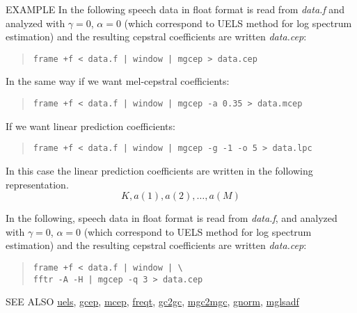 \begin{qsection}{EXAMPLE}
In the following speech data in float format is read
from {\em data.f} and analyzed with $\gamma=0$, $\alpha=0$
(which correspond to UELS method for log spectrum estimation)
and the resulting cepstral coefficients are written {\em data.cep}:
\begin{quote}
  \verb!frame +f < data.f | window | mgcep > data.cep !
\end{quote}

In the same way if we want mel-cepstral coefficients:
\begin{quote}
 \verb!frame +f < data.f | window | mgcep -a 0.35 > data.mcep !
\end{quote}

If we want linear prediction coefficients:
\begin{quote}
  \verb!frame +f < data.f | window | mgcep -g -1 -o 5 > data.lpc !
\end{quote}
In this case the linear prediction coefficients are written
in the following representation.
\begin{displaymath}
  K, a(1), a(2), \dots, a(M)
\end{displaymath}
\end{qsection}

In the following, speech data in float format is read
from {\em data.f}, and analyzed with $\gamma=0$, $\alpha=0$
(which correspond to UELS method for log spectrum estimation)
and the resulting cepstral coefficients are written {\em data.cep}:
\begin{quote}
  \verb!frame +f < data.f | window | \! \\
  \verb!fftr -A -H | mgcep -q 3 > data.cep!
\end{quote}

\begin{qsection}{SEE ALSO}
\hyperlink{uels}{uels},
\hyperlink{gcep}{gcep},
\hyperlink{mcep}{mcep},
\hyperlink{freqt}{freqt},
\hyperlink{gc2gc}{gc2gc},
\hyperlink{mgc2mgc}{mgc2mgc},
\hyperlink{gnorm}{gnorm},
\hyperlink{mglsadf}{mglsadf}
\end{qsection}
